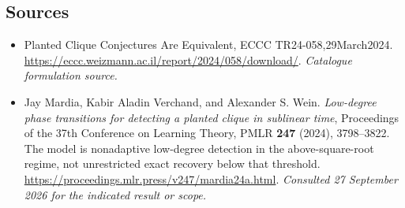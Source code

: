 \documentclass[11pt,a4paper]{article}
\numberwithin{equation}{section}
\begin{document}
\subsection{Sources}
\begin{itemize}\raggedright
\item[\textnormal{[S1]}]\hypertarget{source:statement:1}{} Planted Clique Conjectures Are Equivalent, ECCC TR24-058,29March2024.
\url{https://eccc.weizmann.ac.il/report/2024/058/download/}.
{\small\textit{Catalogue formulation source.}}
\item[\textnormal{[E1]}]\hypertarget{extra:statement:1}{} Jay Mardia, Kabir Aladin Verchand, and Alexander S. Wein.
\emph{Low-degree phase transitions for detecting a planted clique in sublinear time}, Proceedings of the 37th Conference on Learning Theory, PMLR \textbf{247} (2024), 3798--3822. The model is nonadaptive low-degree detection in the above-square-root regime, not unrestricted exact recovery below that threshold.
\url{https://proceedings.mlr.press/v247/mardia24a.html}.
{\small\textit{Consulted 27 September 2026 for the indicated result or scope.}}
\end{itemize}
\end{document}
